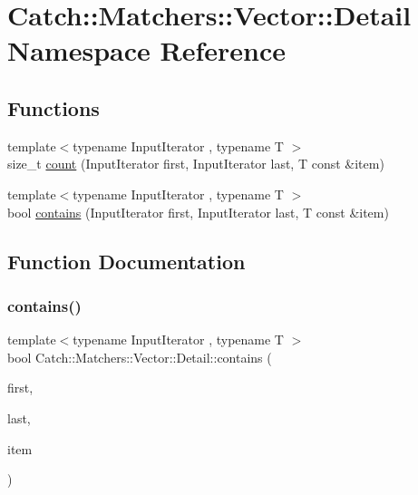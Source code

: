 \hypertarget{namespace_catch_1_1_matchers_1_1_vector_1_1_detail}{}\section{Catch\+:\+:Matchers\+:\+:Vector\+:\+:Detail Namespace Reference}
\label{namespace_catch_1_1_matchers_1_1_vector_1_1_detail}
\subsection*{Functions}
\begin{DoxyCompactItemize}
\item 
{\footnotesize template$<$typename Input\+Iterator , typename T $>$ }\\size\+\_\+t \mbox{\hyperlink{namespace_catch_1_1_matchers_1_1_vector_1_1_detail_abca18680db20c92f848b02a2c2708852}{count}} (Input\+Iterator first, Input\+Iterator last, T const \&item)
\item 
{\footnotesize template$<$typename Input\+Iterator , typename T $>$ }\\bool \mbox{\hyperlink{namespace_catch_1_1_matchers_1_1_vector_1_1_detail_a73a425534a3113c590fac55f64338d1e}{contains}} (Input\+Iterator first, Input\+Iterator last, T const \&item)
\end{DoxyCompactItemize}


\subsection{Function Documentation}
\mbox{\label{namespace_catch_1_1_matchers_1_1_vector_1_1_detail_a73a425534a3113c590fac55f64338d1e}} 
\subsubsection{\texorpdfstring{contains()}{contains()}}
{\footnotesize\ttfamily template$<$typename Input\+Iterator , typename T $>$ \\
bool Catch\+::\+Matchers\+::\+Vector\+::\+Detail\+::contains (\begin{DoxyParamCaption}\item[{Input\+Iterator}]{first,  }\item[{Input\+Iterator}]{last,  }\item[{T const \&}]{item }\end{DoxyParamCaption})}

